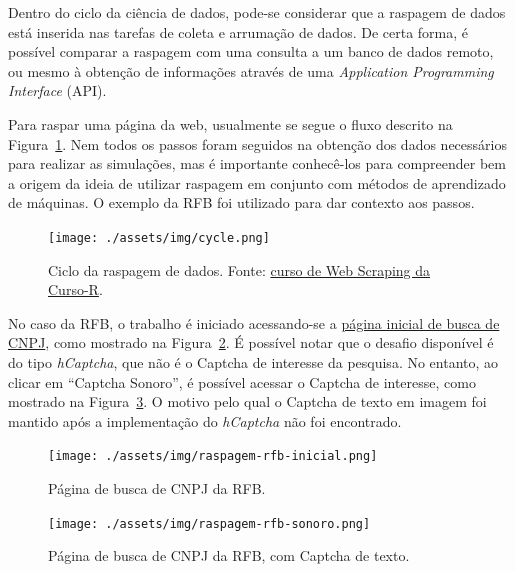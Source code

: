 \documentclass[12pt,twoside,brazilian]{book}
\begin{document}
Dentro do ciclo da ciência de dados, pode-se considerar que a raspagem
de dados está inserida nas tarefas de coleta e arrumação de dados. De
certa forma, é possível comparar a raspagem com uma consulta a um banco
de dados remoto, ou mesmo à obtenção de informações através de uma
\emph{Application Programming Interface} (API).

Para raspar uma página da web, usualmente se segue o fluxo descrito na
Figura~\ref{fig-fluxo-web-scraping}. Nem todos os passos foram seguidos
na obtenção dos dados necessários para realizar as simulações, mas é
importante conhecê-los para compreender bem a origem da ideia de
utilizar raspagem em conjunto com métodos de aprendizado de máquinas. O
exemplo da RFB foi utilizado para dar contexto aos passos.

\begin{figure}

{\centering \texttt{[image: ./assets/img/cycle.png]}

}

\caption{\label{fig-fluxo-web-scraping}Ciclo da raspagem de dados.
Fonte: \href{https://curso-r.github.io/main-web-scraping}{curso de Web
Scraping da Curso-R}.}

\end{figure}

No caso da RFB, o trabalho é iniciado acessando-se a
\href{http://servicos.receita.fazenda.gov.br/Servicos/cnpjreva/Cnpjreva_Solicitacao.asp}{página
inicial de busca de CNPJ}, como mostrado na
Figura~\ref{fig-raspagem-rfb-inicial}. É possível notar que o desafio
disponível é do tipo \emph{hCaptcha}, que não é o Captcha de interesse
da pesquisa. No entanto, ao clicar em ``Captcha Sonoro'', é possível
acessar o Captcha de interesse, como mostrado na
Figura~\ref{fig-raspagem-rfb-sonoro}. O motivo pelo qual o Captcha de
texto em imagem foi mantido após a implementação do \emph{hCaptcha} não
foi encontrado.

\begin{figure}

{\centering \texttt{[image: ./assets/img/raspagem-rfb-inicial.png]}

}

\caption{\label{fig-raspagem-rfb-inicial}Página de busca de CNPJ da
RFB.}

\end{figure}

\begin{figure}

{\centering \texttt{[image: ./assets/img/raspagem-rfb-sonoro.png]}

}

\caption{\label{fig-raspagem-rfb-sonoro}Página de busca de CNPJ da RFB,
com Captcha de texto.}

\end{figure}
\end{document}
